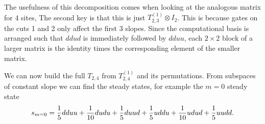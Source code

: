 The usefulness of this decomposition comes when looking at the analogous matrix for 4 sites,
The second key is that this is just $T_{2,3}^{(1)}\otimes I_2$. This is because gates on the cuts 1 and 2 only affect the first 3 slopes. Since the computational basis is arranged such that $ddud$ is immediately followed by $dduu$, each $2\times 2$ block of a larger matrix is the identity times the corresponding element of the smaller matrix.

We can now build the full $T_{2,4}$ from $T_{2,4}^{(1)}$ and its permutations. From subspaces of constant slope we can find the steady states, for example the $m=0$ steady state
\begin{align}
s_{m=0} = \frac{1}{5}dduu + \frac{1}{10}dudu + \frac{1}{5} duud + \frac{1}{5}uddu + \frac{1}{10}udud + \frac{1}{5}uudd.
\end{align}

